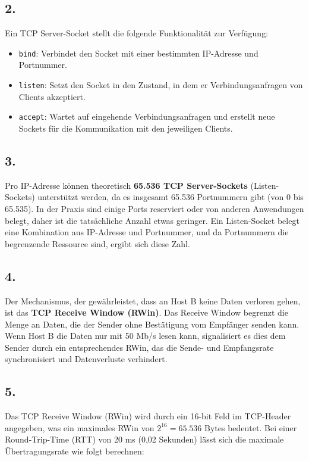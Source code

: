 \documentclass[a4paper]{scrartcl}
\begin{document}
\subsection*{2.}
Ein TCP Server-Socket stellt die folgende Funktionalität zur Verfügung:
\begin{itemize}
    \item \texttt{bind}: Verbindet den Socket mit einer bestimmten IP-Adresse und Portnummer.
    \item \texttt{listen}: Setzt den Socket in den Zustand, in dem er Verbindungsanfragen von Clients akzeptiert.
    \item \texttt{accept}: Wartet auf eingehende Verbindungsanfragen und erstellt neue Sockets für die Kommunikation mit den jeweiligen Clients.
\end{itemize}

\subsection*{3.}
Pro IP-Adresse können theoretisch \textbf{65.536 TCP Server-Sockets} (Listen-Sockets) unterstützt werden, da es insgesamt 65.536 Portnummern gibt (von 0 bis 65.535). In der Praxis sind einige Ports reserviert oder von anderen Anwendungen belegt, daher ist die tatsächliche Anzahl etwas geringer. Ein Listen-Socket belegt eine Kombination aus IP-Adresse und Portnummer, und da Portnummern die begrenzende Ressource sind, ergibt sich diese Zahl.

\subsection*{4.}
Der Mechanismus, der gewährleistet, dass an Host B keine Daten verloren gehen, ist das \textbf{TCP Receive Window (RWin)}. Das Receive Window begrenzt die Menge an Daten, die der Sender ohne Bestätigung vom Empfänger senden kann. Wenn Host B die Daten nur mit 50 Mb/s lesen kann, signalisiert es dies dem Sender durch ein entsprechendes RWin, das die Sende- und Empfangsrate synchronisiert und Datenverluste verhindert.

\subsection*{5.}
Das TCP Receive Window (RWin) wird durch ein 16-bit Feld im TCP-Header angegeben, was ein maximales RWin von $2^{16} = 65.536$ Bytes bedeutet. Bei einer Round-Trip-Time (RTT) von 20 ms (0,02 Sekunden) lässt sich die maximale Übertragungsrate wie folgt berechnen:
\end{document}

